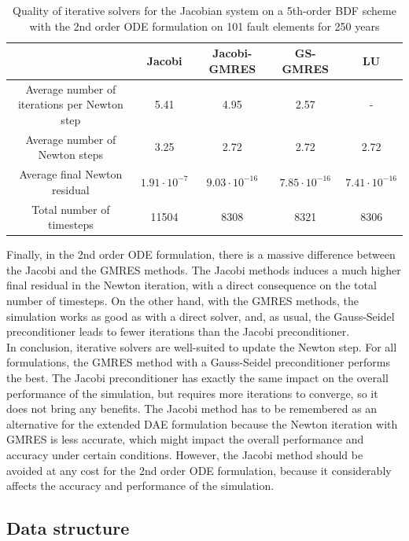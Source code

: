 \begin{table}[H]
	\begin{tabular}{ | c || c c c | c |}
		\hline
		& Jacobi & Jacobi-GMRES & GS-GMRES & LU \\ \hline\hline
		Average number of iterations per Newton step &  5.41  &    4.95   &    2.57  & -  \\
		Average number of Newton steps & 3.25  &     2.72    &   2.72  &     2.72 \\
		Average final Newton residual &   $1.91\cdot10^{-7}$  & $9.03\cdot10^{-16}$  & $7.85\cdot10^{-16}$  & $7.41\cdot10^{-16}$ \\
		Total number of timesteps & 11504  &      8308    &    8321    &    8306 \\
		 \hline
	\end{tabular}
	\caption{Quality of iterative solvers for the Jacobian system on a 5th-order BDF scheme with the 2nd order ODE formulation on 101 fault elements for 250 years}
	\label{tab:extendedODE_iterativeSolversJacobian}
\end{table}
Finally, in the 2nd order ODE formulation, there is a massive difference between the Jacobi and the GMRES methods. The Jacobi methods induces a much higher final residual in the Newton iteration, with a direct consequence on the total number of timesteps. On the other hand, with the GMRES methods, the simulation works as good as with a direct solver, and, as usual, the Gauss-Seidel preconditioner leads to fewer iterations than the Jacobi preconditioner. \\

In conclusion, iterative solvers are well-suited to update the Newton step. For all formulations, the GMRES method with a Gauss-Seidel preconditioner performs the best. The Jacobi preconditioner has exactly the same impact on the overall performance of the simulation, but requires more iterations to converge, so it does not bring any benefits. The Jacobi method has to be remembered as an alternative for the extended DAE formulation because the Newton iteration with GMRES is less accurate, which might impact the overall performance and accuracy under certain conditions. However, the Jacobi method should be avoided at any cost for the 2nd order ODE formulation, because it considerably affects the accuracy and performance of the simulation. 

\subsection{Data structure}
